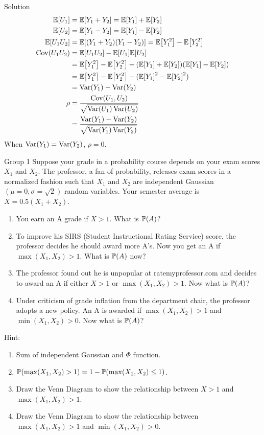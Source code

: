 \documentclass{article}
\begin{document}
\begin{solution}
    {Solution}
    \begin{align*}
        \E{U_1} &= \E{Y_1+Y_2} = \E{Y_1}+\E{Y_2} \\
        \E{U_2} &= \E{Y_1-Y_2} = \E{Y_1}-\E{Y_2} \\
        \E{U_1U_2} &= \E{(Y_1+Y_2)(Y_1-Y_2)} = \E{Y_1^2}-\E{Y_2^2} \\
        \Cov(U_1U_2) &= \E{U_1U_2}-\E{U_1}\E{U_2} \\
        & = \E{Y_1^2}-\E{Y_2^2}-(\E{Y_1}+\E{Y_2})(\E{Y_1}-\E{Y_2}) \\
        &= \E{Y_1^2}-\E{Y_2^2}-(\E{Y_1}^2-\E{Y_2}^2) \\
        &= \Var(Y_1)-\Var(Y_2) \\
        \rho &= \frac{\Cov(U_1,U_2)}{\sqrt{\Var(U_1)\Var(U_2)}} \\
        &= \frac{\Var(Y_1)-\Var(Y_2)}{\sqrt{\Var(Y_1)\Var(Y_2)}}
    \end{align*}
    When $\mathop{\mathrm{Var}}\nolimits(Y_1)=\mathop{\mathrm{Var}}\nolimits(Y_2)$, $\rho=0$.
\end{solution}
\begin{problem}
    {Group 1}
    Suppose your grade in a probability course depends on your exam scores $X_1$ and $X_2$. The professor, a fan of probability, releases exam scores in a normalized fashion such that $X_1$ and $X_2$ are independent Gaussian $(\mu = 0, \sigma=\sqrt{2})$ random variables. Your semester average is $X = 0.5(X_1 + X_2)$.
    \begin{enumerate}
        \item You earn an A grade if $X > 1$. What is $\P{A}$?
        \item To improve his SIRS (Student Instructional Rating Service) score, the professor decides he should award more A's. Now you get an A if $\max(X_1,X_2) > 1$. What is $\P{A}$ now?
        \item The professor found out he is unpopular at ratemyprofessor.com and decides to award an A if either $X >1$ or $\max(X_1,X_2) > 1$. Now what is $\P{A}$?
        \item Under criticism of grade inflation from the department chair, the professor adopts a new policy. An A is awarded if $\max(X_1,X_2) > 1$ and $\min(X_1,X_2) > 0$. Now what is $\P{A}$?
    \end{enumerate}
    \begin{solution}
        {Hint:}
        \begin{enumerate}
            \item Sum of independent Gaussian and $\Phi$ function.
            \item $\P{\max(X_1,X_2)>1}=1-\P{\max(X_1,X_2)\leq 1}$.
            \item Draw the Venn Diagram to show the relationship between $X>1$ and $\max(X_1,X_2) > 1$.
            \item Draw the Venn Diagram to show the relationship between $\max(X_1,X_2) > 1$ and $\min(X_1,X_2) > 0$.
        \end{enumerate}
    \end{solution}
\end{problem}
\end{document}
